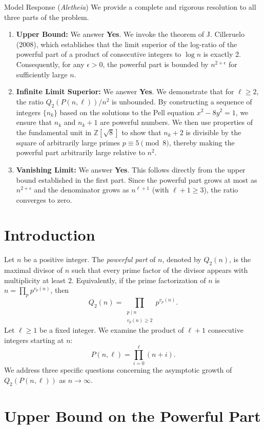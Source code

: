 \documentclass[11pt]{article}
\newcommand{\Qtwo}{Q_2}
\begin{document}
\begin{solution}{Model Response (\emph{Aletheia})}
   We provide a complete and rigorous resolution to all three parts of the problem.
\begin{enumerate}
    \item \textbf{Upper Bound:} We answer \textbf{Yes}. We invoke the theorem of J. Cilleruelo (2008), which establishes that the limit superior of the log-ratio of the powerful part of a product of consecutive integers to $\log n$ is exactly 2. Consequently, for any $\epsilon > 0$, the powerful part is bounded by $n^{2+\epsilon}$ for sufficiently large $n$.
    \item \textbf{Infinite Limit Superior:} We answer \textbf{Yes}. We demonstrate that for $\ell \ge 2$, the ratio $Q_2(P(n, \ell))/n^2$ is unbounded. By constructing a sequence of integers $\{n_k\}$ based on the solutions to the Pell equation $x^2 - 8y^2 = 1$, we ensure that $n_k$ and $n_k+1$ are powerful numbers. We then use properties of the fundamental unit in $\mathbb{Z}[\sqrt{8}]$ to show that $n_k+2$ is divisible by the square of arbitrarily large primes $p \equiv 5 \pmod 8$, thereby making the powerful part arbitrarily large relative to $n^2$.
    \item \textbf{Vanishing Limit:} We answer \textbf{Yes}. This follows directly from the upper bound established in the first part. Since the powerful part grows at most as $n^{2+\epsilon}$ and the denominator grows as $n^{\ell+1}$ (with $\ell+1 \ge 3$), the ratio converges to zero.
\end{enumerate}


\section{Introduction}

Let $n$ be a positive integer. The \textit{powerful part} of $n$, denoted by $\Qtwo(n)$, is the maximal divisor of $n$ such that every prime factor of the divisor appears with multiplicity at least 2. Equivalently, if the prime factorization of $n$ is $n = \prod_{p} p^{v_p(n)}$, then
\[ \Qtwo(n) = \prod_{\substack{p \mid n \\ v_p(n) \ge 2}} p^{v_p(n)}. \]
Let $\ell \ge 1$ be a fixed integer. We examine the product of $\ell+1$ consecutive integers starting at $n$:
\[ P(n, \ell) = \prod_{i=0}^\ell (n+i). \]
We address three specific questions concerning the asymptotic growth of $\Qtwo(P(n, \ell))$ as $n \to \infty$.

\section{Upper Bound on the Powerful Part}


\end{solution}
\end{document}
